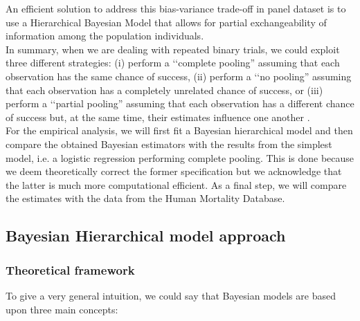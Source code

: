 An efficient solution to address this bias-variance trade-off in panel dataset is to use a Hierarchical Bayesian Model that allows for partial exchangeability of information among the population individuals. \\

In summary, when we are dealing with repeated binary trials, we could exploit three different strategies: (i) perform a \lq\lq complete pooling'' assuming that each observation has the same chance of success, (ii) perform a \lq\lq no pooling'' assuming that each observation has a completely unrelated chance of success, or (iii) perform a \lq\lq partial pooling'' assuming that each observation has a different chance of success but, at the same time, their estimates influence one another \citep{GelmanHill2006}. \\

For the empirical analysis, we will first fit a Bayesian hierarchical model and then compare the obtained Bayesian estimators with the results from the simplest model, i.e. a logistic regression performing complete pooling. This is done because we deem theoretically correct the former specification but we acknowledge that the latter is much more computational efficient. As a final step, we will compare the estimates with the data from the Human Mortality Database.


\subsection{Bayesian Hierarchical model approach}

\subsubsection{Theoretical framework}
To give a very general intuition, we could say that Bayesian models are based upon three main concepts:

